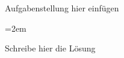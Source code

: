 \subsubsection{} %

Aufgabenstellung hier einfügen

\vspace{1\baselineskip}

\begin{solution}    

    \vspace{1\baselineskip}

    \leftskip=2em

    Schreibe hier die Lösung

\end{solution}